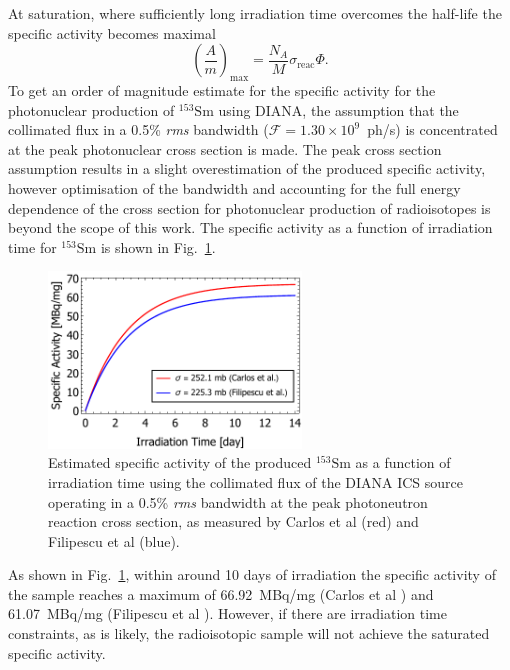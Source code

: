 \documentclass[../main.tex]{subfiles}
\begin{document}
At saturation, where sufficiently long irradiation time overcomes the half-life the specific activity becomes maximal
\begin{equation}
\left(\frac{A}{m}\right)_{\mathrm{max}} = \frac{N_{A}}{M}\sigma_{\mathrm{reac}}\Phi.
\label{eq:sat_specific_activity}    
\end{equation}
To get an order of magnitude estimate for the specific activity for the photonuclear production of $^{153}\mathrm{Sm}$ using DIANA, the assumption that the collimated flux in a 0.5\% \textit{rms} bandwidth ($\mathcal{F} = 1.30\times 10^{9}$~ph/\si{\second}) is concentrated at the peak photonuclear cross section is made. The peak cross section assumption results in a slight overestimation of the produced specific activity, however optimisation of the bandwidth and accounting for the full energy dependence of the cross section for photonuclear production of radioisotopes is beyond the scope of this work. The specific activity as a function of irradiation time for $^{153}\mathrm{Sm}$ is shown in Fig.~\ref{fig:153Sm_specific_activity}.
\begin{figure}[!h]
\centering
\includegraphics[width=0.6\textwidth]{Figures/DIANA_Inverse_Compton_Source_Design/154Sm_specific_activity.pdf}
\caption{Estimated specific activity of the produced $^{153}\mathrm{Sm}$ as a function of irradiation time using the collimated flux of the DIANA ICS source operating in a 0.5\% \textit{rms} bandwidth at the peak photoneutron reaction cross section, as measured by Carlos et al \cite{carlos1974giant} (red) and Filipescu et al \cite{filipescu2014photoneutron} (blue).}
\label{fig:153Sm_specific_activity}
\end{figure}

As shown in Fig.~\ref{fig:153Sm_specific_activity}, within around 10 days of irradiation the specific activity of the sample reaches a maximum of 66.92~\si{\mega\becquerel}/\si{\milli\gram} (Carlos et al \cite{carlos1974giant}) and 61.07~\si{\mega\becquerel}/\si{\milli\gram} (Filipescu et al \cite{filipescu2014photoneutron}). However, if there are irradiation time constraints, as is likely, the radioisotopic sample will not achieve the saturated specific activity. 
\end{document}
